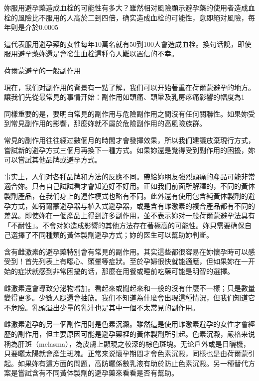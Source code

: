 \documentclass[12pt,UTF8]{ctexbook}
\begin{document}
妳服用避孕藥造成血栓的可能性有多大？雖然相对風險顯示避孕藥的使用者造成血栓的風險比不服用的人高於二到四倍，确实造成血栓的可能性，意即絕对風險，每年則是介於0.0005%

這代表服用避孕藥的女性每年10萬名就有50到100人會造成血栓。換句话說，即使服用避孕藥妳還是會發生血栓這種令人難以置信的不幸。





荷爾蒙避孕的一般副作用




現在，我们对副作用的背景有一點了解，我们可以开始著重在荷爾蒙避孕的地方。讓我们先從最常見的事情开始：副作用如頭痛、頭暈及乳房疼痛影響的幅度為1%

同樣重要的是，要明白常見的副作用与危險副作用之間沒有任何關聯性。如果妳受到常見副作用的影響，那麼妳就不屬於危險副作用的高風險族群。

常見的副作用往往經过數個月的時間才會發揮效果，所以我们建議放棄現行方式，嘗試新的避孕方式三個月再換下一種方式。如果妳還是覺得受到副作用的困擾，妳可以嘗試其他品牌或避孕方式。

事实上，人们对各種品牌和方法的反應不同。帶給妳朋友強烈頭痛的產品可能非常適合妳。只有自己試試看才會知道好不好用。正如我们前面所解釋的，不同的黃体製劑產品，在我们身上的運作模式也略有不同。此外還有使用包含純黃体製劑的避孕方式，如荷爾蒙避孕器与植入式避孕器，或是含有雌激素的複合產品都有不同的差異。即使妳在一個產品上得到許多副作用，並不表示妳对一般荷爾蒙避孕法具有「不耐性」。不會对妳造成影響的其他方法存在著極高的可能性。妳只需要确保自己選擇了不同種類的黃体製劑避孕方式；妳的医生可以幫助妳判斷。

含有雌激素的避孕藥特別會有常見的副作用。其实這些都很容易在妳懷孕時可以感受到！首先列表上有噁心、頭暈等症狀。至於孕婦很快就能適應，但如果妳在一开始的症狀就感到非常困擾的话，那麼在用餐或睡前吃藥可能是明智的選擇。

雌激素還會導致分泌物增加。看起來或聞起來和一般的沒有什麼不一樣；只是數量變得更多。少數人腿還會抽筋。我们不知道為什麼會出現這種情況，但我们知道它不危險。乳頭溢出少量的乳汁也是其中一個不太常見的副作用。

雌激素避孕的另一個副作用則是色素沉澱。雖然這是使用雌激素避孕的女性才會經歷的副作用，但主要原因可能是避孕藥裡的黃体製劑所引起。色素沉澱，嚴格来说稱為肝斑（melasma），為皮膚上顯現之較深的棕色斑塊。无论戶外或是日曬機，只要曬太陽就會產生斑塊。正常来说懷孕期間才會色素沉澱，同樣也是由荷爾蒙引起。如果妳有這方面的問題，高防曬係數乳液有助於防止色素沉澱。另一種替代方案是嘗試含有不同黃体製劑的避孕藥來看看是否有幫助。
\end{document}
